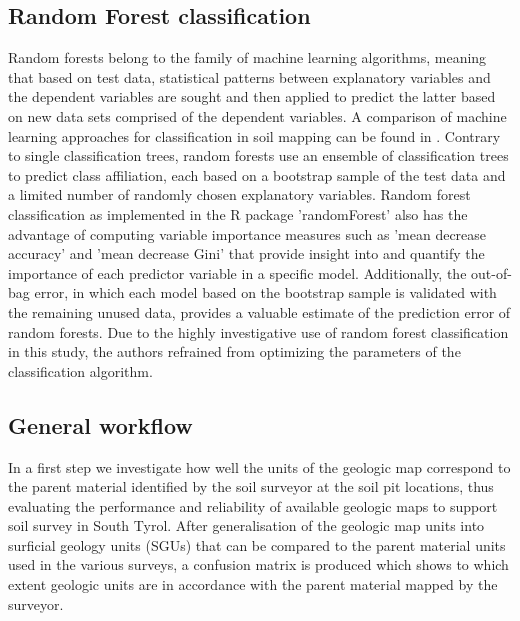 \documentclass[preprint,12pt,authoryear]{elsarticle}
\begin{document}
\subsection{Random Forest classification }
Random forests \citep{Breiman2001} belong to the family of machine learning algorithms, meaning that based on test data, statistical patterns between explanatory variables and the dependent variables are sought and then applied to predict the latter based on new data sets comprised of the dependent variables. A comparison of machine learning approaches for classification in soil mapping can be found in \cite{Heung2016}. Contrary to single classification trees, random forests use an ensemble of classification trees to predict class affiliation, each based on a bootstrap sample of the test data and a limited number of randomly chosen explanatory variables. Random forest classification as implemented in the R \citep{cran2014} package 'randomForest' also has the advantage of computing variable importance measures such as 'mean decrease accuracy' and 'mean decrease Gini' that provide insight into and quantify the importance of each predictor variable in a specific model.  Additionally, the out-of-bag error, in which each model based on the bootstrap sample is validated with the remaining unused data, provides a valuable estimate of the prediction error of random forests. Due to the highly investigative use of random forest classification in this study, the authors refrained from optimizing the parameters of the classification algorithm.

\subsection{General workflow}
In a first step we investigate how well the units of the  geologic map correspond to the parent material identified by the soil surveyor at the soil pit locations, thus evaluating the performance and reliability of available geologic maps to support soil survey in South Tyrol. After generalisation of the geologic map units into surficial geology units (SGUs) that can be compared to the parent material units used in the various surveys, a confusion matrix is produced which shows to which extent geologic units are in accordance with the parent material mapped by the surveyor. 
\end{document}

